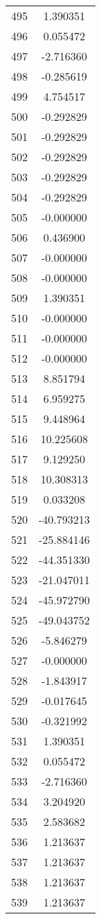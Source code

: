 \documentclass[12pt]{article}
\begin{document}
\begin{longtable}{@{}cc@{}}
495 & 1.390351 \\
496 & 0.055472 \\
497 & -2.716360 \\
498 & -0.285619 \\
499 & 4.754517 \\
500 & -0.292829 \\
501 & -0.292829 \\
502 & -0.292829 \\
503 & -0.292829 \\
504 & -0.292829 \\
505 & -0.000000 \\
506 & 0.436900 \\
507 & -0.000000 \\
508 & -0.000000 \\
509 & 1.390351 \\
510 & -0.000000 \\
511 & -0.000000 \\
512 & -0.000000 \\
513 & 8.851794 \\
514 & 6.959275 \\
515 & 9.448964 \\
516 & 10.225608 \\
517 & 9.129250 \\
518 & 10.308313 \\
519 & 0.033208 \\
520 & -40.793213 \\
521 & -25.884146 \\
522 & -44.351330 \\
523 & -21.047011 \\
524 & -45.972790 \\
525 & -49.043752 \\
526 & -5.846279 \\
527 & -0.000000 \\
528 & -1.843917 \\
529 & -0.017645 \\
530 & -0.321992 \\
531 & 1.390351 \\
532 & 0.055472 \\
533 & -2.716360 \\
534 & 3.204920 \\
535 & 2.583682 \\
536 & 1.213637 \\
537 & 1.213637 \\
538 & 1.213637 \\
539 & 1.213637 \\

\end{longtable}
\end{document}
